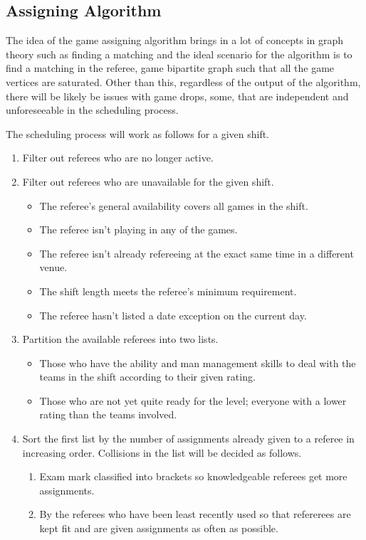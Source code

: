 \documentclass{article}
\begin{document}
\subsection{Assigning Algorithm}
The idea of the game assigning algorithm brings in a lot of concepts in graph theory such as finding a matching and the ideal scenario for the algorithm is to find a matching in the referee, game bipartite graph such that all the game vertices are saturated. Other than this, regardless of the output of the algorithm, there will be likely be issues with game drops, some, that are independent and unforeseeable in the scheduling process.

The scheduling process will work as follows for a given shift.

\begin{enumerate}
\item Filter out referees who are no longer active.
\item Filter out referees who are unavailable for the given shift.
\begin{itemize}
\item The referee's general availability covers all games in the shift.
\item The referee isn't playing in any of the games.
\item The referee isn't already refereeing at the exact same time in a different venue.
\item The shift length meets the referee's minimum requirement.
\item The referee hasn't listed a date exception on the current day.
\end{itemize}
\item Partition the available referees into two lists.
\begin{itemize}
\item Those who have the ability and man management skills to deal with the teams in the shift according to their given rating.
\item Those who are not yet quite ready for the level; everyone with a lower rating than the teams involved.
\end{itemize}
\item Sort the first list by the number of assignments already given to a referee in increasing order. Collisions in the list will be decided as follows.
\begin{enumerate}
\item Exam mark classified into brackets so knowledgeable referees get more assignments.
\item By the referees who have been least recently used so that refererees are kept fit and are given assignments as often as possible.

\end{enumerate}
\end{enumerate}
\end{document}
